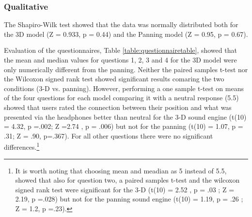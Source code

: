 \documentclass[journal]{IEEEtran}
\begin{document}
\subsubsection{Qualitative}
The Shapiro-Wilk test showed that the data was normally distributed both for the 3D model (Z = 0.933, p = 0.44) and the Panning model (Z = 0.95, p = 0.67). 

Evaluation of the questionnaires, Table \ref{table:questionnairetable}, showed that the mean and median values for questions 1, 2, 3 and 4 for the 3D model were only numerically different from the panning. Neither the paired samples t-test nor the Wilcoxon signed rank test showed significant results comaring the two conditions (3-D vs. panning). However, performing a one sample t-test on means of the four questions for each model comparing it with a neutral response (5.5) showed that users rated the connection between their position and what was presented via the headphones better than neutral for the 3-D sound engine (t(10) = 4.32, p =.002; Z =2.74 , p = .006) but not for the panning (t(10) = 1.07, p = .31; Z = .90, p=.367). For all other questions there were no significant differences.\footnote{It is worth noting that choosing mean and meadian as 5 instead of 5.5, showed that also for question two, a paired samples t-test and the wilcoxon signed rank test were significant for the 3-D (t(10) = 2.52 , p = .03 ; Z = 2.19, p =.028) but not for the panning sound engine (t(10) = 1.19, p = .26 ; Z = 1.2, p =.23).}

\begin{table}[h]
  \caption{Questionnaire results}
  \label{table:questionnairetable}
\end{table}
\end{document}
